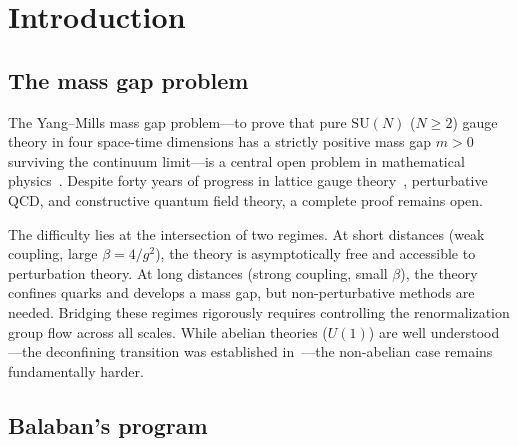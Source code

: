 \documentclass[11pt]{article}
\theoremstyle{definition}
\newcommand{\SU}{\mathrm{SU}}
\begin{document}
\begin{abstract}
trials\textup{)} this gives the joint floor $\beta_0^{\mathrm{int,(75)}}\le 146$ \textup{(}Theorem~\ref{thm:floor-v75}\textup{)}, breaking the v74 ceiling by $38$ units and reducing v74's rigorous floor by $39.4\%$.  Crossing the M\"unster wall $\beta_R\approx 2$, which sits $\sim 73\times$ below the v75 numerical floor, requires either pushing the strong-coupling anchor $\beta_{\mathrm{sc}}$ above $\beta_R$ or a different mid-$\beta$ analysis; the small-field RG architecture cannot reach $\beta_R$ \textup{(}Remark~\ref{rem:munster-wall}\textup{)}.  The M\"unster wall therefore remains the irreducible analytic obstruction.
\end{abstract}

\tableofcontents

\section{Introduction}\label{sec:intro}

\subsection{The mass gap problem}

The Yang--Mills mass gap problem---to prove that pure $\SU(N)$ ($N\ge 2$) gauge
theory in four space-time dimensions has a strictly positive mass gap
$m>0$ surviving the continuum limit---is a central open problem in
mathematical physics~\cite{JaffeWitten}.
Despite forty years of progress in lattice gauge
theory~\cite{Creutz80,OS73}, perturbative QCD, and constructive
quantum field theory, a complete proof remains open.

The difficulty lies at the intersection of two regimes.  At short
distances (weak coupling, large $\beta=4/g^2$), the theory is
asymptotically free and accessible to perturbation theory.  At long
distances (strong coupling, small $\beta$), the theory confines quarks
and develops a mass gap, but non-perturbative methods are needed.
Bridging these regimes rigorously requires controlling the renormalization
group flow across all scales.  While abelian theories ($U(1)$) are well
understood---the deconfining transition was established
in~\cite{Guth80,FS82}---the non-abelian case remains fundamentally harder.

\subsection{Balaban's program}
\end{document}
